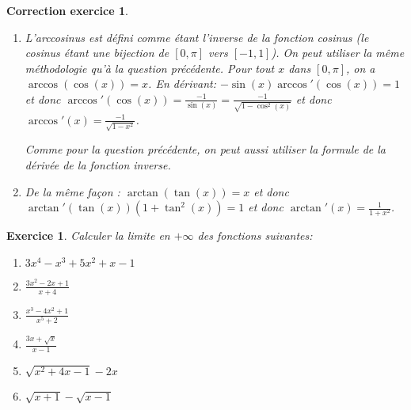 \documentclass[12pt]{article}
\newtheorem{exercice}{\bf Exercice}
\newtheorem{correction}{\bf Correction exercice}
\newenvironment{exo}{
\begin{exercice}\smallskip\normalfont}{\end{exercice}
}
\newenvironment{cor}{
\begin{correction}\smallskip\normalfont}{\end{correction}
}
\begin{document}
\begin{cor}
\begin{enumerate}
  Notez que l'on peut aussi utiliser la formule de la d\'eriv\'ee de l'inverse d'une fonction:
  $(f^{-1})'(x) = \frac{1}{f'(f^{-1}(x))} = \frac{1}{\cos(\arcsin(x))}$ avec $f(x) = \sin(x)$.
  De plus, pour compl\'eter cette d\'emonstration, on peut montrer que $\cos(\arcsin(x)) = \sqrt{1 - x^2}$ :
  ceci vient de $\cos^2(t) + \sin^2(t) = 1$ combin\'e avec le changement de variables
  $t = \arcsin(x)$.

\item L'arccosinus est d\'efini comme \'etant l'inverse de la fonction cosinus
  (le cosinus \'etant une bijection de $[0,\pi]$ vers $[-1,1]$).
  On peut utiliser la m\^eme m\'ethodologie qu'\`a la question pr\'ec\'edente.
  Pour tout $x$ dans $[0,\pi]$, on a $\arccos(\cos(x)) = x$. En d\'erivant:
  $- \sin(x) \arccos'(\cos(x)) = 1$ et donc
  $\arccos'(\cos(x)) = \frac{-1}{\sin(x)} = \frac{-1}{\sqrt{1-\cos^2(x)}}$
  et donc $\arccos'(x) = \frac{-1}{\sqrt{1-x^2}}$.

  Comme pour la question pr\'ec\'edente, on peut aussi utiliser la formule de la d\'eriv\'ee
  de la fonction inverse.

\item De la m\^eme fa\c{c}on :
  $\arctan(\tan(x)) = x$
  et donc
  $\arctan'(\tan(x)) (1+\tan^2(x)) = 1$
  et donc $\arctan'(x) = \frac{1}{1+x^2}$.
\end{enumerate}
\end{cor}
\color{black}
\fi



\begin{exo} Calculer la limite en $+\infty$ des fonctions suivantes:
\begin{multicols}{3}
\begin{enumerate}
\item $3x^4 - x^3 + 5x^2 + x - 1$
\item $\frac{3x^2-2x+1}{x+4}$
\item $\frac{x^3-4x^2+1}{x^5+2}$
\item $\frac{3x+\sqrt{x}}{x-1}$
\item $\sqrt{x^2+4x-1} - 2x$
\item $\sqrt{x+1} - \sqrt{x-1}$
\end{enumerate}
\end{multicols}
\end{exo}
\end{document}
